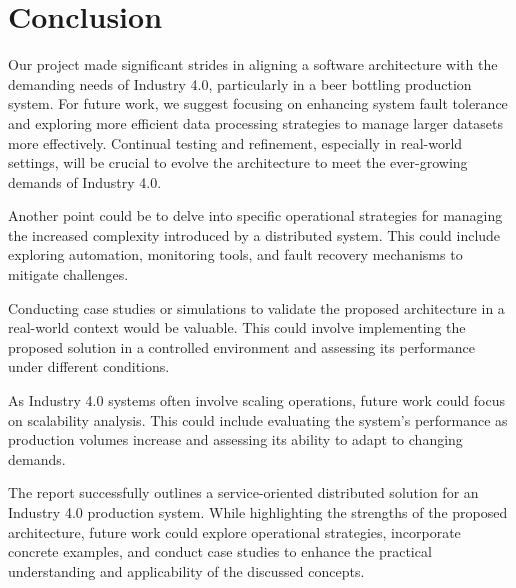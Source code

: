 \documentclass[conference]{IEEEtran}
\begin{document}
\section{Conclusion}

Our project made significant strides in aligning a software architecture with the demanding needs of Industry 4.0, particularly in a beer bottling production system. For future work, we suggest focusing on enhancing system fault tolerance and exploring more efficient data processing strategies to manage larger datasets more effectively. Continual testing and refinement, especially in real-world settings, will be crucial to evolve the architecture to meet the ever-growing demands of Industry 4.0.

Another point could be to delve into specific operational strategies for managing the increased complexity introduced by a distributed system. This could include exploring automation, monitoring tools, and fault recovery mechanisms to mitigate challenges.

Conducting case studies or simulations to validate the proposed architecture in a real-world context would be valuable. This could involve implementing the proposed solution in a controlled environment and assessing its performance under different conditions.

As Industry 4.0 systems often involve scaling operations, future work could focus on scalability analysis. This could include evaluating the system's performance as production volumes increase and assessing its ability to adapt to changing demands.

The report successfully outlines a service-oriented distributed solution for an Industry 4.0 production system. While highlighting the strengths of the proposed architecture, future work could explore operational strategies, incorporate concrete examples, and conduct case studies to enhance the practical understanding and applicability of the discussed concepts.





\vspace{12pt}

\appendix



\end{document}
